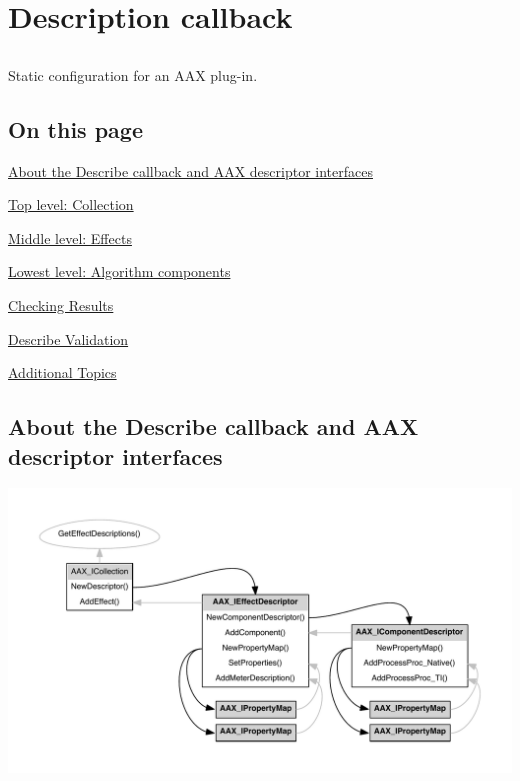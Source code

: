 \hypertarget{a00326}{}\section{Description callback}
\label{a00326}


\subsection{ }
Static configuration for an A\+A\+X plug-\/in. 

\hypertarget{a00326_describe_contents}{}\subsection{On this page}\label{a00326_describe_contents}
\begin{DoxyItemize}
\item \hyperlink{a00326_describe_about}{About the Describe callback and A\+A\+X descriptor interfaces} \item \hyperlink{a00326_describe_collection}{Top level\+: Collection} \item \hyperlink{a00326_describe_effects}{Middle level\+: Effects} \item \hyperlink{a00326_describe_component}{Lowest level\+: Algorithm components} \item \hyperlink{a00326_describe_checking_results}{Checking Results} \item \hyperlink{a00326_describe_validation}{Describe Validation} \item \hyperlink{a00326_describe_additionaltopics}{Additional Topics}\end{DoxyItemize}
 \hypertarget{a00326_describe_about}{}\subsection{About the Describe callback and A\+A\+X descriptor interfaces}\label{a00326_describe_about}
 
\begin{DoxyImageNoCaption}
  \mbox{\includegraphics[width=\textwidth,height=\textheight/2,keepaspectratio=true]{dot_aax_desc_interfaces}}
\end{DoxyImageNoCaption}



